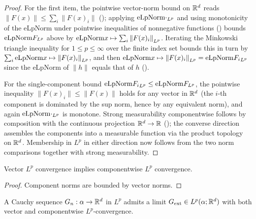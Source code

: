 \begin{proof}
\leanok

For the first item, the pointwise vector-norm bound on $\mathbb{R}^d$ reads
$\|F(x)\| \le \sum_i \|F(x)_i\|$ (); applying
$\mathrm{eLpNorm}{\cdot}_{L^p}$ and using monotonicity of the eLpNorm under
pointwise inequalities of nonnegative functions
() bounds $\mathrm{eLpNorm}{F}_{L^p}$ above by
$\mathrm{eLpNorm}{x \mapsto \sum_i \|F(x)_i\|}_{L^p}$. Iterating the Minkowski
triangle inequality  for $1 \le p \le \infty$ over
the finite index set bounds this in turn by
$\sum_i \mathrm{eLpNorm}{x \mapsto \|F(x)_i\|}_{L^p}$, and then
$\mathrm{eLpNorm}{x \mapsto \|F(x)_i\|}_{L^p} = \mathrm{eLpNorm}{F_i}_{L^p}$ since the
eLpNorm of $\|h\|$ equals that of $h$ ().

For the single-component bound $\mathrm{eLpNorm}{F_i}_{L^p} \le
\mathrm{eLpNorm}{F}_{L^p}$, the pointwise inequality $\|F(x)_i\| \le \|F(x)\|$
holds for any vector in $\mathbb{R}^d$ (the $i$-th component is dominated by the
sup norm, hence by any equivalent norm), and again $\mathrm{eLpNorm}{\cdot}_{L^p}$
is monotone. Strong measurability componentwise follows by composition with
the continuous projection $\mathbb{R}^d \to \mathbb{R}$ (); the
converse direction assembles the components into a measurable function via
the product topology on $\mathbb{R}^d$. Membership in $L^p$ in either direction now
follows from the two norm comparisons together with strong measurability.
\end{proof}

\begin{theorem}
\label{thm:tendsto_eLpNorm_pi_component}
\leanok
Vector $L^p$ convergence implies componentwise $L^p$ convergence.
\end{theorem}

\begin{proof}
\leanok
{}

Component norms are bounded by vector norms.
\end{proof}

\begin{theorem}
\label{thm:exists_pi_limit_of_cauchy_eLpNorm}
\leanok
A Cauchy sequence $G_n : \alpha \to \mathbb{R}^d$ in $L^p$ admits a limit
$G_{\mathrm{ext}} \in L^p(\alpha; \mathbb{R}^d)$ with both vector and componentwise
$L^p$-convergence.
\end{theorem}

